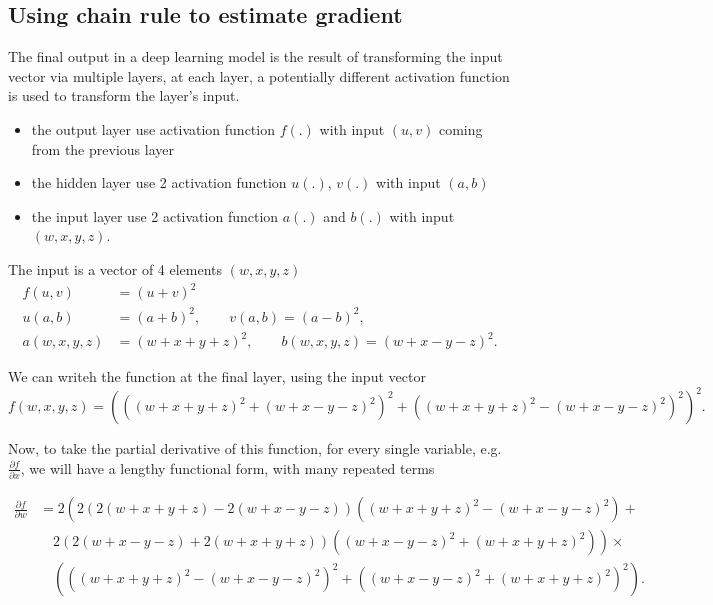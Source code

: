 \subsection{Using chain rule to estimate gradient}
\label{sec:gradient-estimate-using-chain-rule}
\label{sec:chain-rule}


The final output in a deep learning model is the result of transforming the
input vector via multiple layers, at each layer, a potentially different
activation function is used to transform the layer's input. 

\begin{itemize}
  \item  the output layer use activation function $f(.)$ with input $(u, v)$ coming from the previous layer
  
  \item the hidden layer use 2 activation function $u(.)$, $v(.)$ with input $(a,b)$
  
  \item the input layer use 2 activation function $a(.)$ and $b(.)$ with input $(w, x, y, z)$.
\end{itemize}

The input is a vector of 4 elements $(w, x, y, z)$
\begin{equation}
\begin{aligned}f(u, v) & = (u+v)^{2} \\u(a, b) & = (a+b)^{2}, \qquad v(a, b) = (a-b)^{2}, \\a(w, x, y, z) & = (w+x+y+z)^{2}, \qquad b(w, x, y, z) = (w+x-y-z)^2.\end{aligned}
\end{equation}

We can writeh the function at the final layer, using the input vector
\begin{equation}
f(w, x, y, z) = \left(\left((w+x+y+z)^2+(w+x-y-z)^2\right)^2+\left((w+x+y+z)^2-(w+x-y-z)^2\right)^2\right)^2.
\end{equation}

Now, to take the partial derivative of this function, for every single variable,
e.g. $\frac{\partial f}{\partial x}$, we will have a lengthy functional form,
with many repeated terms

\begin{equation}
\begin{aligned}
\frac{\partial f}{\partial w} & = 2 \left(2 \left(2 (w + x + y + z) - 2 (w + x - y - z)\right) \left((w + x + y + z)^{2}- (w + x - y - z)^{2}\right) + \right.\\
& \left. \quad 2 \left(2 (w + x - y - z) + 2 (w + x + y + z)\right) \left((w + x - y - z)^{2}+ (w + x + y + z)^{2}\right)\right) \times \\
& \quad \left(\left((w + x + y + z)^{2}- (w + x - y - z)^2\right)^{2}+ \left((w + x - y - z)^{2}+ (w + x + y + z)^{2}\right)^{2}\right).
\end{aligned}
\end{equation}

